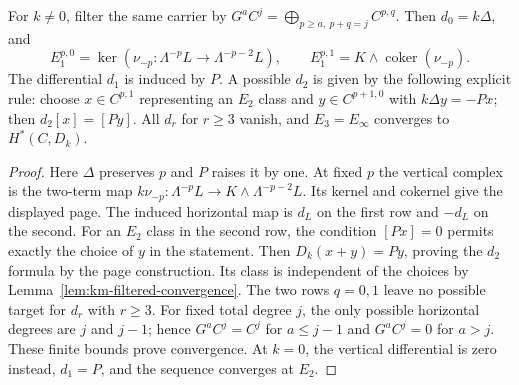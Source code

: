 \begin{proposition}
\label{prop:km-central-first}
For $k\ne0$, filter the same carrier by
$G^aC^j=\bigoplus_{p\ge a,\ p+q=j}C^{p,q}$.
Then $d_0=k\Delta$, and
\[
E_1^{p,0}=\ker(\nu_{-p}:\Lambda^{-p}L\to\Lambda^{-p-2}L),\qquad
E_1^{p,1}=K\wedge\operatorname{coker}(\nu_{-p}).
\]
The differential $d_1$ is induced by $P$.  A possible $d_2$ is given by
the following explicit rule: choose $x\in C^{p,1}$ representing an $E_2$ class
and $y\in C^{p+1,0}$ with $k\Delta y=-Px$; then $d_2[x]=[Py]$.
All $d_r$ for $r\ge3$ vanish, and $E_3=E_\infty$ converges to $H^*(C,D_k)$.
\end{proposition}
\begin{proof}
Here $\Delta$ preserves $p$ and $P$ raises it by one.  At fixed $p$ the
vertical complex is the two-term map
$k\nu_{-p}:\Lambda^{-p}L\to K\wedge\Lambda^{-p-2}L$.
Its kernel and cokernel give the displayed page.  The induced horizontal
map is $d_L$ on the first row and $-d_L$ on the second.
For an $E_2$ class in the second row, the condition $[Px]=0$ permits exactly
the choice of $y$ in the statement.  Then $D_k(x+y)=Py$, proving the $d_2$
formula by the page construction.  Its class is independent of the choices
by Lemma~\ref{lem:km-filtered-convergence}.
The two rows $q=0,1$ leave no possible target for $d_r$ with $r\ge3$.
For fixed total degree $j$, the only possible horizontal degrees are $j$ and
$j-1$; hence $G^aC^j=C^j$ for $a\le j-1$ and $G^aC^j=0$ for $a>j$.
These finite bounds prove convergence.  At $k=0$, the vertical differential
is zero instead, $d_1=P$, and the sequence converges at $E_2$.
\end{proof}

